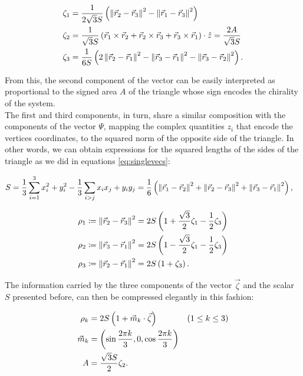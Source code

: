 \begin{align*}
\zeta_1 &= \frac{1}{2\sqrt{3}S}\left( \left\lVert \vec{r}_2 -\vec{r}_3 \right\rVert^2-\left\lVert \vec{r}_1 -\vec{r}_3 \right\rVert^2 \right)\\
\zeta_2 &= \frac{1}{\sqrt{3}S}\left( \vec{r}_1\times\vec{r}_2 + \vec{r}_2\times\vec{r}_3 +\vec{r}_3\times\vec{r}_1 \right)\cdot\hat{z} = \frac{2A}{\sqrt{3}S} \\
\zeta_3 &= \frac{1}{6S}\left( 2\left\lVert \vec{r}_2 -\vec{r}_1 \right\rVert^2-\left\lVert \vec{r}_3 -\vec{r}_1 \right\rVert^2-\left\lVert \vec{r}_3 -\vec{r}_2 \right\rVert^2 \right).
\end{align*}

From this, the second component of the vector can be easily interpreted as proportional to the signed area $A$ of the triangle whose sign encodes the chirality of the system.\\

The first and third components, in turn, share a similar composition with the components of the vector $\Psi$, mapping the complex quantities $z_i$ that encode the vertices coordinates, to the squared norm of the opposite side of the triangle. In other words, we can obtain expressions for the squared lengths of the sides of the triangle as we did in equations \eqref{eq:singlevecs}:

\begin{align*}
S &= \frac{1}{3}\sum_{i=1}^3 x_i^2 + y_i^2 -\frac{1}{3}\sum_{i > j} x_ix_j + y_iy_j  = \frac{1}{6}\left( \left\lVert \vec{r}_1 -\vec{r}_2 \right\rVert^2+\left\lVert \vec{r}_2 -\vec{r}_3 \right\rVert^2+\left\lVert \vec{r}_3 -\vec{r}_1 \right\rVert^2 \right),
\end{align*}

\begin{equation}
\begin{aligned}
\rho_1 &\coloneqq \left\lVert \vec{r}_2 -\vec{r}_3 \right\rVert^2 = 2S\left( 1+\frac{\sqrt{3}}{2}\zeta_1-\frac{1}{2}\zeta_3 \right) \\
\rho_2 &\coloneqq \left\lVert \vec{r}_3 -\vec{r}_1 \right\rVert^2 = 2S\left( 1-\frac{\sqrt{3}}{2}\zeta_1-\frac{1}{2}\zeta_3 \right) \\
\rho_3 &\coloneqq \left\lVert \vec{r}_2 -\vec{r}_1 \right\rVert^2 = 2S\left( 1+\zeta_3 \right).
\end{aligned}
\label{eq:lados}
\end{equation}

The information carried by the three components of the vector $\vec{\zeta}$ and the scalar $S$ presented before, can then be compressed elegantly in this fashion:

\begin{equation}
\begin{aligned}
\rho_k &= 2S\left( 1+\vec{m}_k\cdot\vec{\zeta} \right) & (1 \leq k \leq 3)\\
\vec{m}_k &= \left( \sin{\frac{2\pi k}{3}},0,\cos{\frac{2\pi k}{3}} \right)\\
A &= \frac{\sqrt{3}S}{2} \zeta_2.
\end{aligned}
\label{eq:compressed}
\end{equation}


